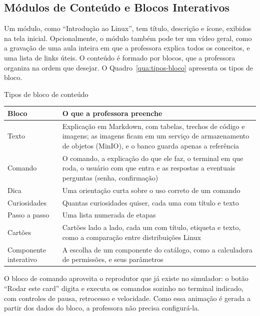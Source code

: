 \subsection{Módulos de Conteúdo e Blocos Interativos}
\label{sec:modulos-conteudo}

Um módulo, como ``Introdução ao Linux'', tem título, descrição e ícone, exibidos na tela inicial. Opcionalmente, o módulo também pode ter um vídeo geral, como a gravação de uma aula inteira em que a professora explica todos os conceitos, e uma lista de links úteis. O conteúdo é formado por blocos, que a professora organiza na ordem que desejar. O Quadro~\ref{qua:tipos-bloco} apresenta os tipos de bloco.

\begin{quadro}[htbp]
    \caption{Tipos de bloco de conteúdo}
    \label{qua:tipos-bloco}
    \footnotesize
    \begin{tabularx}{\textwidth}{|>{\raggedright\arraybackslash}p{3.0cm}|L|}
        \hline
        \textbf{Bloco} & \textbf{O que a professora preenche} \\
        \hline
        Texto & Explicação em Markdown, com tabelas, trechos de código e imagens; as imagens ficam em um serviço de armazenamento de objetos (MinIO), e o banco guarda apenas a referência \\
        \hline
        Comando & O comando, a explicação do que ele faz, o terminal em que roda, o usuário com que entra e as respostas a eventuais perguntas (senha, confirmação) \\
        \hline
        Dica & Uma orientação curta sobre o uso correto de um comando \\
        \hline
        Curiosidades & Quantas curiosidades quiser, cada uma com título e texto \\
        \hline
        Passo a passo & Uma lista numerada de etapas \\
        \hline
        Cartões & Cartões lado a lado, cada um com título, etiqueta e texto, como a comparação entre distribuições Linux \\
        \hline
        Componente interativo & A escolha de um componente do catálogo, como a calculadora de permissões, e seus parâmetros \\
        \hline
    \end{tabularx}
\end{quadro}

O bloco de comando aproveita o reprodutor que já existe no simulador: o botão ``Rodar este card'' digita e executa os comandos sozinho no terminal indicado, com controles de pausa, retrocesso e velocidade. Como essa animação é gerada a partir dos dados do bloco, a professora não precisa configurá-la.

